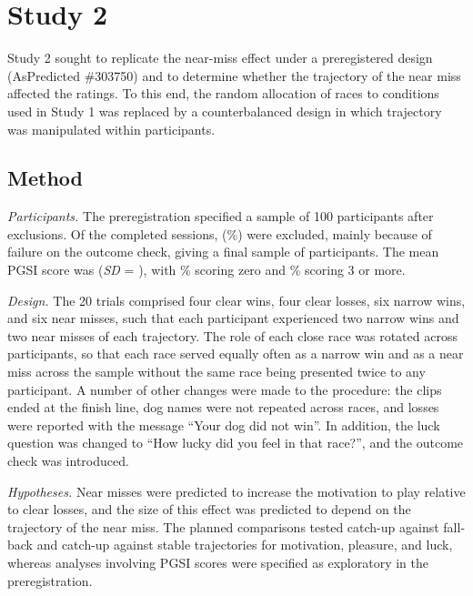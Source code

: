 \documentclass[man,floatsintext,donotrepeattitle]{apa7}
\begin{document}
\section{Study 2}
Study 2 sought to replicate the near-miss effect under a preregistered design (AsPredicted \#303750)
and to determine whether the trajectory of the near miss affected the ratings. To this end, the
random allocation of races to conditions used in Study 1 was replaced by a counterbalanced design in
which trajectory was manipulated within participants.

\subsection{Method}
\textit{Participants.} The preregistration specified a sample of 100 participants after exclusions.
Of the  completed sessions,  (\%) were excluded,
mainly because of failure on the outcome check, giving a final sample of 
participants. The mean PGSI score was  (\textit{SD} = ), with
\% scoring zero and \% scoring 3 or more.

\textit{Design.} The 20 trials comprised four clear wins, four clear losses, six narrow wins, and six
near misses, such that each participant experienced two narrow wins and two near misses of each
trajectory. The role of each close race was rotated across participants, so that each race served
equally often as a narrow win and as a near miss across the sample without the same race being
presented twice to any participant. A number of other changes were made to the procedure: the clips
ended at the finish line, dog names were not repeated across races, and losses were reported with the
message ``Your dog did not win''. In addition, the luck question was changed to ``How lucky did you
feel in that race?'', and the outcome check was introduced.

\textit{Hypotheses.} Near misses were predicted to increase the motivation to play relative to clear
losses, and the size of this effect was predicted to depend on the trajectory of the near miss. The
planned comparisons tested catch-up against fall-back and catch-up against stable trajectories for
motivation, pleasure, and luck, whereas analyses involving PGSI scores were specified as exploratory
in the preregistration.
\end{document}
